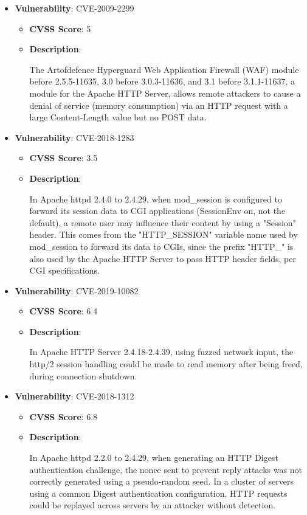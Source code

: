 \documentclass{article}
\begin{document}
\begin{itemize}
        \item \textbf{Vulnerability}: CVE-2009-2299
        \begin{itemize}
            \item \textbf{CVSS Score}:  5 
            \item \textbf{Description}:
            \parbox[t]{0.9\linewidth}{
                \ttfamily The Artofdefence Hyperguard Web Application Firewall (WAF) module before 2.5.5-11635, 3.0 before 3.0.3-11636, and 3.1 before 3.1.1-11637, a module for the Apache HTTP Server, allows remote attackers to cause a denial of service (memory consumption) via an HTTP request with a large Content-Length value but no POST data.
            }
        \end{itemize}
    
        \item \textbf{Vulnerability}: CVE-2018-1283
        \begin{itemize}
            \item \textbf{CVSS Score}:  3.5 
            \item \textbf{Description}:
            \parbox[t]{0.9\linewidth}{
                \ttfamily In Apache httpd 2.4.0 to 2.4.29, when mod\_session is configured to forward its session data to CGI applications (SessionEnv on, not the default), a remote user may influence their content by using a "Session" header. This comes from the "HTTP\_SESSION" variable name used by mod\_session to forward its data to CGIs, since the prefix "HTTP\_" is also used by the Apache HTTP Server to pass HTTP header fields, per CGI specifications.
            }
        \end{itemize}
    
        \item \textbf{Vulnerability}: CVE-2019-10082
        \begin{itemize}
            \item \textbf{CVSS Score}:  6.4 
            \item \textbf{Description}:
            \parbox[t]{0.9\linewidth}{
                \ttfamily In Apache HTTP Server 2.4.18-2.4.39, using fuzzed network input, the http/2 session handling could be made to read memory after being freed, during connection shutdown.
            }
        \end{itemize}
    
        \item \textbf{Vulnerability}: CVE-2018-1312
        \begin{itemize}
            \item \textbf{CVSS Score}:  6.8 
            \item \textbf{Description}:
            \parbox[t]{0.9\linewidth}{
                \ttfamily In Apache httpd 2.2.0 to 2.4.29, when generating an HTTP Digest authentication challenge, the nonce sent to prevent reply attacks was not correctly generated using a pseudo-random seed. In a cluster of servers using a common Digest authentication configuration, HTTP requests could be replayed across servers by an attacker without detection.
            }
        \end{itemize}
    

\end{itemize}
\end{document}
